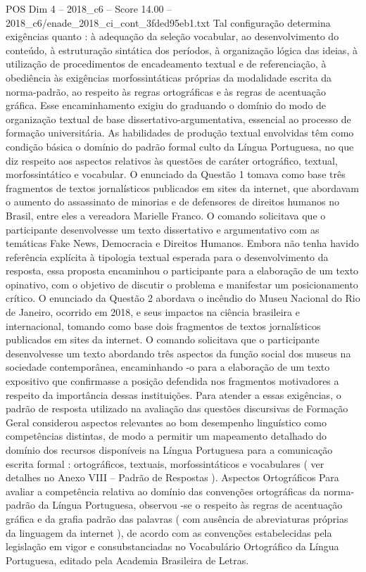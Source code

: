 \begin{textsample}{POS Dim 4 – 2018\_c6 – Score 14.00 – 2018\_c6/enade\_2018\_ci\_cont\_3fded95eb1.txt}
Tal configuração determina exigências quanto : à adequação da seleção vocabular, ao desenvolvimento do conteúdo, à estruturação sintática dos períodos, à organização lógica das ideias, à utilização de procedimentos de encadeamento textual e de referenciação, à obediência às exigências morfossintáticas próprias da modalidade escrita da norma-padrão, ao respeito às regras ortográficas e às regras de acentuação gráfica.
Esse encaminhamento exigiu do graduando o domínio do modo de organização textual de base dissertativo-argumentativa, essencial ao processo de formação universitária.
As habilidades de produção textual envolvidas têm como condição básica o domínio do padrão formal culto da Língua Portuguesa, no que diz respeito aos aspectos relativos às questões de caráter ortográfico, textual, morfossintático e vocabular.
O enunciado da Questão 1 tomava como base três fragmentos de textos jornalísticos publicados em sites da internet, que abordavam o aumento do assassinato de minorias e de defensores de direitos humanos no Brasil, entre eles a vereadora Marielle Franco.
O comando solicitava que o participante desenvolvesse um texto dissertativo e argumentativo com as temáticas Fake News, Democracia e Direitos Humanos.
Embora não tenha havido referência explícita à tipologia textual esperada para o desenvolvimento da resposta, essa proposta encaminhou o participante para a elaboração de um texto opinativo, com o objetivo de discutir o problema e manifestar um posicionamento crítico.
O enunciado da Questão 2 abordava o incêndio do Museu Nacional do Rio de Janeiro, ocorrido em 2018, e seus impactos na ciência brasileira e internacional, tomando como base dois fragmentos de textos jornalísticos publicados em sites da internet.
O comando solicitava que o participante desenvolvesse um texto abordando três aspectos da função social dos museus na sociedade contemporânea, encaminhando -o para a elaboração de um texto expositivo que confirmasse a posição defendida nos fragmentos motivadores a respeito da importância dessas instituições.
Para atender a essas exigências, o padrão de resposta utilizado na avaliação das questões discursivas de Formação Geral considerou aspectos relevantes ao bom desempenho linguístico como competências distintas, de modo a permitir um mapeamento detalhado do domínio dos recursos disponíveis na Língua Portuguesa para a comunicação escrita formal : ortográficos, textuais, morfossintáticos e vocabulares ( ver detalhes no Anexo VIII – Padrão de Respostas ).
Aspectos Ortográficos Para avaliar a competência relativa ao domínio das convenções ortográficas da norma-padrão da Língua Portuguesa, observou -se o respeito às regras de acentuação gráfica e da grafia padrão das palavras ( com ausência de abreviaturas próprias da linguagem da internet ), de acordo com as convenções estabelecidas pela legislação em vigor e consubstanciadas no Vocabulário Ortográfico da Língua Portuguesa, editado pela Academia Brasileira de Letras.

\end{textsample}
